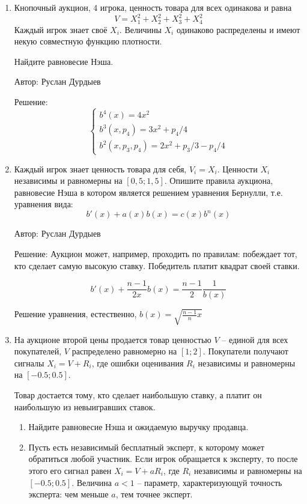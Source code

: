 \begin{enumerate}
\item Кнопочный аукцион, 4 игрока, ценность товара для всех одинакова и равна 
\begin{equation}
V=X_{1}^{2}+X_{2}^{2}+X_{3}^{2}+X_{4}^{2}
\end{equation}
Каждый игрок знает своё $X_{i}$. Величины $X_{i}$ одинаково распределены и имеют некую совместную функцию плотности.

Найдите равновесие Нэша.

Автор: Руслан Дурдыев

Решение: 
\begin{equation}
\begin{cases}
b^{4}(x)=4x^{2} \\
b^{3}(x,p_{4})=3x^{2}+p_{4}/4 \\
b^{2}(x,p_{3},p_{4})=2x^{2}+p_{3}/3-p_{4}/4
\end{cases}
\end{equation}

\item Каждый игрок знает ценность товара для себя, $V_{i}=X_{i}$. Ценности $X_{i}$ независимы и равномерны на $[0,5;1,5]$. Опишите правила аукциона, равновесие Нэша в котором является решением уравнения Бернулли, т.е. уравнения вида:
\begin{equation}
b'(x)+a(x)b(x)=c(x)b^{n}(x)
\end{equation}

Автор: Руслан Дурдыев

Решение: Аукцион может, например, проходить по правилам: побеждает тот, кто сделает самую высокую ставку. Победитель платит квадрат своей ставки.

\begin{equation}
b'(x)+\frac{n-1}{2x}b(x)=\frac{n-1}{2}\frac{1}{b(x)}
\end{equation}

Решение уравнения, естественно, $b(x)=\sqrt{\frac{n-1}{n}x}$

\item На аукционе второй цены продается товар ценностью $V$ -- единой для всех покупателей, $V$ распределено равномерно на $[1;2]$. Покупатели получают сигналы $X_{i}=V+R_{i}$, где ошибки оценивания $R_{i}$ независимы и равномерны на $[-0.5;0.5]$.

Товар достается тому, кто сделает наибольшую ставку, а платит он наибольшую из невыигравших ставок.

\begin{enumerate}
\item Найдите равновесие Нэша и ожидаемую выручку продавца.
\item Пусть есть независимый бесплатный эксперт, к которому может обратиться любой участник. Если игрок обращается к эксперту, то после этого его сигнал равен $X_{i}=V+aR_{i}$, где $R_{i}$ независимы и равномерны на $[-0.5;0.5]$. Величина $a<1$ -- параметр, характеризующуй точность эксперта: чем меньше $a$, тем точнее эксперт. 


\end{enumerate}
\end{enumerate}
